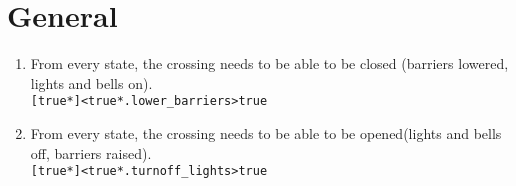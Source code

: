 \documentclass[final]{report}
\begin{document}
\section{General}

\begin{enumerate}
	\item From every state, the crossing needs to be able to be closed (barriers lowered, lights and bells on).\\
		\texttt{[true*]<true*.lower\_barriers>true}
	\item From every state, the crossing needs to be able to be opened(lights and bells off, barriers raised).\\
		\texttt{[true*]<true*.turnoff\_lights>true}
\end{enumerate}
\end{document}
